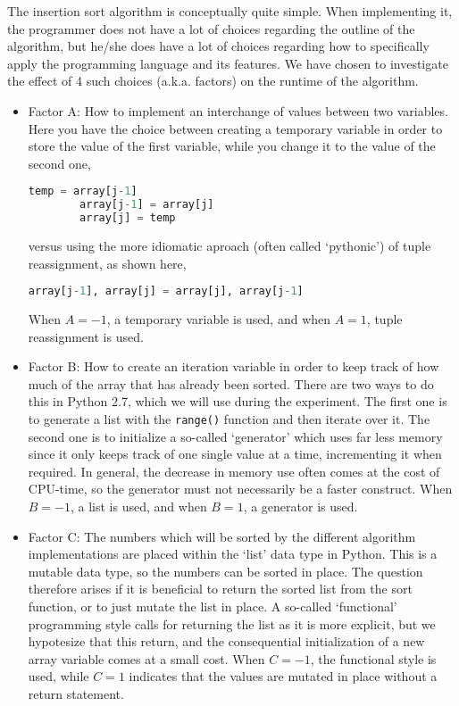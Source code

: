 The insertion sort algorithm is conceptually quite simple. When implementing it, the programmer does not have a lot of choices regarding the outline of the algorithm, but he/she does have a lot of choices regarding how to specifically apply the programming language and its features. We have chosen to investigate the effect of 4 such choices (a.k.a. factors) on the runtime of the algorithm.    

\begin{itemize}
    \item Factor A: How to implement an interchange of values between two variables. Here you have the choice between creating a temporary variable in order to store the value of the first variable, while you change it to the value of the second one,
    \begin{lstlisting}[language=Python]
        temp = array[j-1]
        array[j-1] = array[j]
        array[j] = temp
    \end{lstlisting}
    versus using the more idiomatic aproach (often called `pythonic') of tuple reassignment, as shown here,
    \begin{lstlisting}[language=Python]
        array[j-1], array[j] = array[j], array[j-1]
    \end{lstlisting}
    When $A=-1$, a temporary variable is used, and when $A=1$, tuple reassignment is used.
 
    \item Factor B: How to create an iteration variable in order to keep track of how much of the array that has already been sorted. There are two ways to do this in Python 2.7, which we will use during the experiment. The first one is to generate a list with the \texttt{range()} function and then iterate over it. The second one is to initialize a so-called `generator' which uses far less memory since it only keeps track of one single value at a time, incrementing it when required. In general, the decrease in memory use often comes at the cost of CPU-time, so the generator must not necessarily be a faster construct. When $B=-1$, a list is used, and when $B=1$, a generator is used.
    
    \item Factor C: The numbers which will be sorted by the different algorithm implementations are placed within the `list' data type in Python. This is a mutable data type, so the numbers can be sorted in place. The question therefore arises if it is beneficial to return the sorted list from the sort function, or to just mutate the list in place. A so-called `functional' programming style calls for returning the list as it is more explicit, but we hypotesize that this return, and the consequential initialization of a new array variable comes at a small cost. When $C=-1$, the functional style is used, while $C=1$ indicates that the values are mutated in place without a return statement.
    

\end{itemize}
